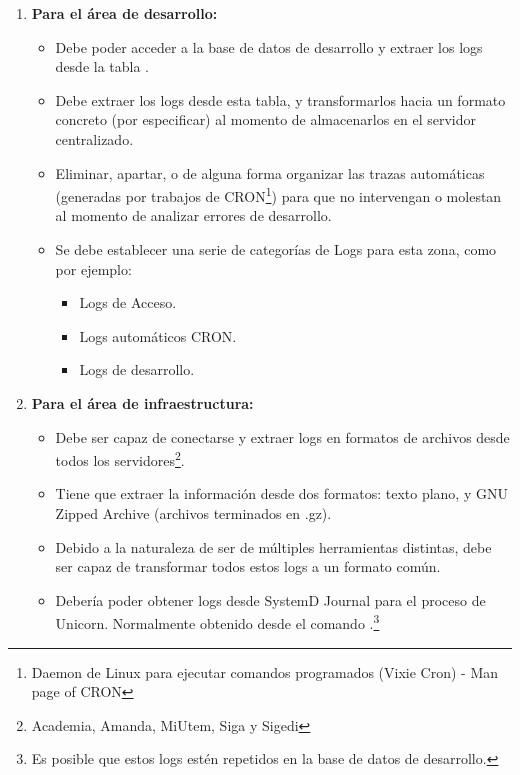 \begin{enumerate}
  \item \textbf{Para el área de desarrollo: }
    \begin{itemize}
      \item Debe poder acceder a la base de datos de desarrollo y extraer los logs desde la tabla .
      \item Debe extraer los logs desde esta tabla, y transformarlos hacia un formato concreto (por especificar) al momento de almacenarlos en el servidor centralizado.
      \item Eliminar, apartar, o de alguna forma organizar las trazas automáticas (generadas por trabajos de CRON\footnote{Daemon de Linux para ejecutar comandos programados (Vixie Cron) - Man page of CRON}) para que no intervengan o molestan al momento de analizar errores de desarrollo.
        \item Se debe establecer una serie de categorías de Logs para esta zona, como por ejemplo:
          \begin{itemize}
            \item Logs de Acceso.
            \item Logs automáticos CRON.
            \item Logs de desarrollo.
          \end{itemize}
    \end{itemize}
    \item \textbf{Para el área de infraestructura: }
      \begin{itemize}
        \item Debe ser capaz de conectarse y extraer logs en formatos de archivos desde todos los servidores\footnote{Academia, Amanda, MiUtem, Siga y Sigedi}.
        \item Tiene que extraer la información desde dos formatos: texto plano, y GNU Zipped Archive (archivos terminados en .gz).
          \item Debido a la naturaleza de ser de múltiples herramientas distintas, debe ser capaz de transformar todos estos logs a un formato común.
          \item Debería poder obtener logs desde SystemD Journal para el proceso de Unicorn. Normalmente obtenido desde el comando .\footnote{Es posible que estos logs estén repetidos en la base de datos de desarrollo.}
      \end{itemize}
\end{enumerate}

\clearpage
